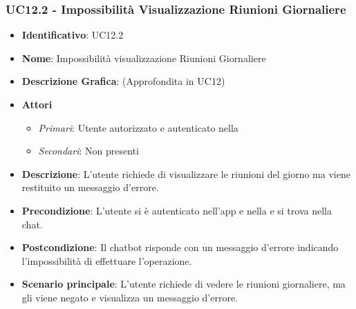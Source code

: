 \subsubsection{UC12.2 - Impossibilità Visualizzazione Riunioni Giornaliere }
\begin{itemize}
	\item \textbf{Identificativo}: UC12.2
	\item \textbf{Nome}: Impossibilità visualizzazione Riunioni Giornaliere
	\item\textbf{Descrizione Grafica}: (Approfondita in UC12)
	\item \textbf{Attori}
	\begin{itemize} 
		\item \textit{Primari}: Utente autorizzato e autenticato nella 
		\item \textit{Secondari}: Non presenti
	\end{itemize}
	\item \textbf{Descrizione}: L'utente richiede di visualizzare le riunioni del giorno ma viene restituito un messaggio d'errore.
	\item \textbf{Precondizione}: L'utente si è autenticato nell'app e nella  e si trova nella chat.
	\item \textbf{Postcondizione}: Il chatbot risponde con un messaggio d'errore indicando l'impossibilità di effettuare l'operazione.
	\item \textbf{Scenario principale}: L'utente richiede di vedere le riunioni giornaliere, ma gli viene negato e visualizza un messaggio d'errore.
\end{itemize}
\newpage